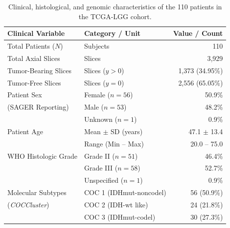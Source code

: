 \documentclass[11pt,a4paper]{article}
\begin{document}
\begin{table}[tbp]
\centering
\caption{Clinical, histological, and genomic characteristics of the 110 patients in the TCGA-LGG cohort.}
\label{tab:clinical_cohort}
\setlength{\tabcolsep}{8pt}
\small
\begin{tabular*}{\textwidth}{@{\extracolsep{\fill}}llr}
\toprule
\textbf{Clinical Variable} & \textbf{Category / Unit} & \textbf{Value / Count} \\
\midrule
Total Patients ($N$) & Subjects & 110 \\
Total Axial Slices & Slices & 3,929 \\
Tumor-Bearing Slices & Slices ($y > 0$) & 1,373 (34.95\%) \\
Tumor-Free Slices & Slices ($y = 0$) & 2,556 (65.05\%) \\
\midrule
Patient Sex & Female ($n=56$) & 50.9\% \\
(SAGER Reporting) & Male ($n=53$) & 48.2\% \\
 & Unknown ($n=1$) & 0.9\% \\
Patient Age & Mean $\pm$ SD (years) & 47.1 $\pm$ 13.4 \\
& Range (Min -- Max) & 20.0 -- 75.0 \\
\midrule
WHO Histologic Grade & Grade II ($n=51$) & 46.4\% \\
& Grade III ($n=58$) & 52.7\% \\
& Unspecified ($n=1$) & 0.9\% \\
\midrule
Molecular Subtypes & COC 1 (IDHmut-noncodel) & 56 (50.9\%) \\
(\textit{COCCluster}) & COC 2 (IDH-wt like) & 24 (21.8\%) \\
& COC 3 (IDHmut-codel) & 30 (27.3\%) \\
\bottomrule
\end{tabular*}
\end{table}
\end{document}
